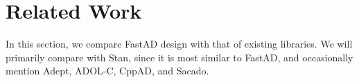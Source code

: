 \section{Related Work}\label{sec:related}

In this section, we compare FastAD design with that of existing libraries.
We will primarily compare with Stan, since it is most similar to FastAD, 
and occasionally mention Adept, ADOL-C, CppAD, and Sacado.






